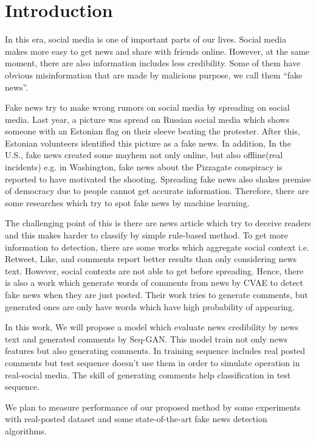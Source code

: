 \section{Introduction}
In this era, social media is one of important parts of our lives.
Social media makes more easy to get news and share with friends online.
However, at the same moment, 
there are also information includes less credibility.
Some of them have obvious misinformation that are made by malicious purpose,
we call them ``fake news''.

Fake news try to make wrong rumors on social media by spreading on social media.
Last year, a picture was spread on Russian social media which shows someone with an Estonian flag on their sleeve beating the protester.
After this, Estonian volunteers identified this picture as a fake news\cite{vaikmaa_2019}.
In addition, In the U.S., fake news created some mayhem not only online, but also offline(real incidents)
e.g. in Washington, fake news about the Pizzagate conspiracy is reported to have motivated the shooting\cite{agencies_2016}.
Spreading fake news also shakes premise of democracy due to people cannot get accurate information.
Therefore, there are some researches which try to spot fake news by machine learning.

The challenging point of this is there are news article which try to deceive readers
and this makes harder to classify by simple rule-based method.
To get more information to detection,
there are some works which aggregate social context i.e. Retweet, Like, and comments
report better results than only considering news text\cite{Guo:2018:RDH:3269206.3271709}.
However, social contexts are not able to get before spreading.
Hence, there is also a work which generate words of comments from news by CVAE to detect fake news when they are just posted\cite{ijcai2018-533}.
Their work tries to generate comments, but generated ones are only have words which have high probability of appearing.

In this work, We will propose a model which evaluate news credibility by news text and generated comments by Seq-GAN\cite{AAAI1714344}.
This model train not only news features but also generating comments.
In training sequence includes real posted comments but test sequence doesn't use them in order to simulate operation in real-social media.
The skill of generating comments help classification in test sequence.

We plan to measure performance of our proposed method by some experiments with real-posted dataset and some state-of-the-art fake news detection algorithms.
